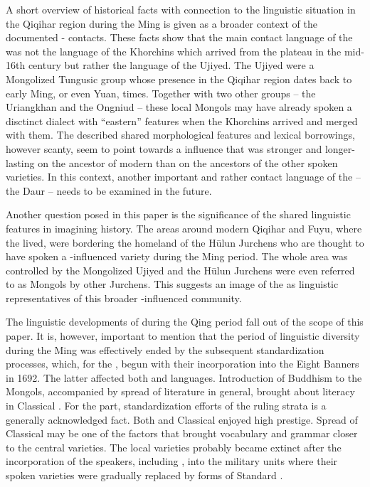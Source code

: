 \documentclass[output=paper,colorlinks,citecolor=brown]{langscibook}
\begin{document}
A short overview of historical facts with connection to the linguistic situation in the Qiqihar region during the Ming is given as a broader context of the documented - contacts. These facts show that the main contact language of the  was not the language of the Khorchins which arrived from the  plateau in the mid-16th century but rather the language of the Ujiyed. The Ujiyed were a Mongolized Tungusic group whose presence in the Qiqihar region dates back to early Ming, or even Yuan, times. Together with two other groups – the Uriangkhan and the Ongniud – these local Mongols may have already spoken a disctinct dialect with “eastern” features when the Khorchins arrived and merged with them. The described shared morphological features and lexical borrowings, however scanty, seem to point towards a  influence that was stronger and longer-lasting on the ancestor of modern  than on the ancestors of the other spoken  varieties. In this context, another important and rather  contact language of the  – the Daur – needs to be examined in the future.

Another question posed in this paper is the significance of the shared linguistic features in imagining  history. The areas around modern Qiqihar and Fuyu, where the  lived, were bordering the homeland of the Hūlun Jurchens who are thought to have spoken a -influenced  variety during the Ming period. The whole area was controlled by the Mongolized Ujiyed and the Hūlun Jurchens were even referred to as Mongols by other Jurchens. This suggests an image of the  as linguistic representatives of this broader -influenced  community. 

The linguistic developments of  during the Qing period fall out of the scope of this paper. It is, however, important to mention that the period of linguistic diversity during the Ming was effectively ended by the subsequent standardization processes, which, for the , begun with their incorporation into the  Eight Banners in 1692. The latter affected both  and  languages. Introduction of Buddhism to the  Mongols, accompanied by spread of literature in general, brought about literacy in Classical . For the  part, standardization efforts of the  ruling strata is a generally acknowledged fact. Both  and Classical  enjoyed high prestige. Spread of Classical  may be one of the factors that brought  vocabulary and grammar closer to the central  varieties. The local  varieties probably became extinct after the incorporation of the speakers, including , into the  military units where their spoken varieties were gradually replaced by forms of Standard . 
\end{document}
